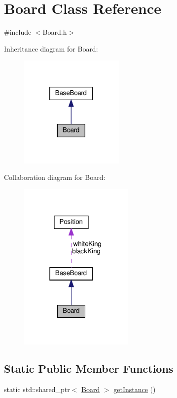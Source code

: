 \hypertarget{class_board}{}\section{Board Class Reference}
\label{class_board}


{\ttfamily \#include $<$Board.\+h$>$}



Inheritance diagram for Board\+:\nopagebreak
\begin{figure}[H]
\begin{center}
\leavevmode
\includegraphics[width=145pt]{class_board__inherit__graph}
\end{center}
\end{figure}


Collaboration diagram for Board\+:\nopagebreak
\begin{figure}[H]
\begin{center}
\leavevmode
\includegraphics[width=159pt]{class_board__coll__graph}
\end{center}
\end{figure}
\subsection*{Static Public Member Functions}
\begin{DoxyCompactItemize}
\item 
static std\+::shared\+\_\+ptr$<$ \hyperlink{class_board}{Board} $>$ \hyperlink{class_board_ad42eee5655e76255fac9d91eee5d8c64}{get\+Instance} ()
\end{DoxyCompactItemize}
